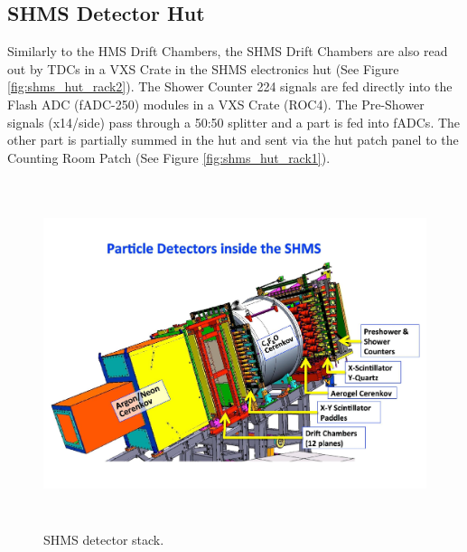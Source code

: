 \documentclass[11pt]{article}
\begin{document}
\subsection{SHMS Detector Hut}
Similarly to the HMS Drift Chambers, the SHMS Drift Chambers are also read out by TDCs in a VXS Crate in the SHMS electronics hut (See Figure \ref{fig:shms_hut_rack2}).
The Shower Counter 224 signals are fed directly into the Flash ADC (fADC-250) modules in a VXS Crate (ROC4). The Pre-Shower signals (x14/side) pass
through a 50:50 splitter and a part is fed into fADCs. The other part is partially summed in the hut and sent via the hut patch panel to the
Counting Room Patch (See Figure \ref{fig:shms_hut_rack1}). 
\begin{figure}[h!]
  \centering
  \includegraphics[width=6.0in, height=4.0in]{SHMS_stack.pdf}
  \caption{SHMS detector stack.}
  \label{fig:shms_stack}
\end{figure}
\end{document}
